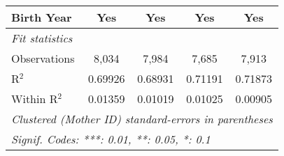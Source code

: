 \documentclass{article}
\begin{document}
\begin{landscape}
\begin{tabular}{lcccc}
   Birth Year                      & Yes                    & Yes            & Yes            & Yes\\  
   \midrule
   \emph{Fit statistics}\\
   Observations                    & 8,034                  & 7,984          & 7,685          & 7,913\\  
   R$^2$                           & 0.69926                & 0.68931        & 0.71191        & 0.71873\\  
   Within R$^2$                    & 0.01359                & 0.01019        & 0.01025        & 0.00905\\  
   \midrule \midrule
   \multicolumn{5}{l}{\emph{Clustered (Mother ID) standard-errors in parentheses}}\\
   \multicolumn{5}{l}{\emph{Signif. Codes: ***: 0.01, **: 0.05, *: 0.1}}\\
\end{tabular}
\par\endgroup


\end{landscape}
\end{document}
